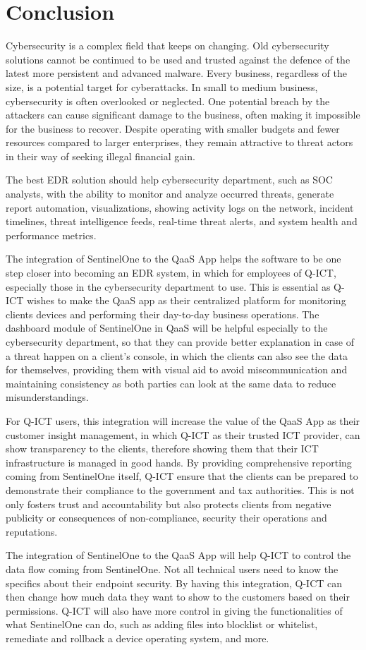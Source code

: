 \section{Conclusion}

Cybersecurity is a complex field that keeps on changing. Old cybersecurity solutions cannot be continued to be used
and trusted against the defence of the latest more persistent and advanced malware. Every business, regardless of the
size, is a potential target for cyberattacks. In small to medium business, cybersecurity is often overlooked or neglected.
One potential breach by the attackers can cause significant damage to the business, often making it impossible for the business
to recover. Despite operating with smaller budgets and fewer resources compared to larger enterprises, they remain attractive
to threat actors in their way of seeking illegal financial gain.

The best EDR solution should help cybersecurity department, such as SOC analysts, with the ability to monitor and analyze
occurred threats, generate report automation, visualizations, showing activity logs on the network, incident timelines, threat
intelligence feeds, real-time threat alerts, and system health and performance metrics.

The integration of SentinelOne to the QaaS App helps the software to be one step closer into becoming an EDR system, in which
for employees of Q-ICT, especially those in the cybersecurity department to use. This is essential as Q-ICT wishes to make the
QaaS app as their centralized platform for monitoring clients devices and performing their day-to-day business operations.
The dashboard module of SentinelOne in QaaS will be helpful especially to the cybersecurity department, so that they can
provide better explanation in case of a threat happen on a client's console, in which the clients can also see the data for
themselves, providing them with visual aid to avoid miscommunication and maintaining consistency as both parties can look at the same
data to reduce misunderstandings.

For Q-ICT users, this integration will increase the value of the QaaS App as their customer insight management, in which Q-ICT
as their trusted ICT provider, can show transparency to the clients, therefore showing them that their ICT infrastructure is
managed in good hands. By providing comprehensive reporting coming from SentinelOne itself, Q-ICT ensure that the clients can be
prepared to demonstrate their compliance to the government and tax authorities. This is not only fosters trust and accountability
but also protects clients from negative publicity or consequences of non-compliance, security their operations and reputations.

The integration of SentinelOne to the QaaS App will help Q-ICT to control the data flow coming from SentinelOne. Not all technical
users need to know the specifics about their endpoint security. By having this integration, Q-ICT can then change how much data
they want to show to the customers based on their permissions. Q-ICT will also have more control in giving the functionalities of
what SentinelOne can do, such as adding files into blocklist or whitelist, remediate and rollback a device operating system,
and more.
